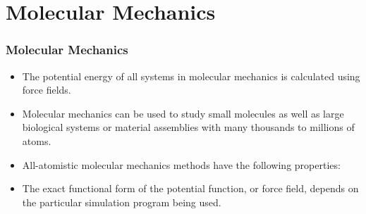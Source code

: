 \documentclass[slidestop,mathserif,compress,xcolor=svgnames]{beamer}
\begin{document}
\section{Molecular Mechanics}
\begin{frame}
  \frametitle{\small Molecular Mechanics}
  \begin{itemize}
    \item The potential energy of all systems in molecular mechanics is calculated using force fields. 
    \item Molecular mechanics can be used to study small molecules as well as large biological systems or material assemblies with many thousands to millions of atoms.
    \item All-atomistic molecular mechanics methods have the following properties:
    \item The exact functional form of the potential function, or force field, depends on the particular simulation program being used. 
  \end{itemize}
\end{frame}
\end{document}
